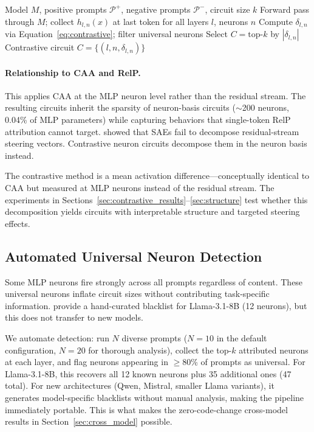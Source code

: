 \documentclass[11pt]{article}
\begin{document}
\begin{algorithm}[h]
\caption{Contrastive Neuron Discovery}
\label{alg:contrastive}
\begin{algorithmic}[1]
\REQUIRE Model $M$, positive prompts $\mathcal{P}^+$, negative prompts $\mathcal{P}^-$, circuit size $k$
    \STATE Forward pass through $M$; collect $h_{l,n}(x)$ at last token for all layers $l$, neurons $n$
\ENDFOR
\STATE Compute $\delta_{l,n}$ via Equation~\ref{eq:contrastive}; filter universal neurons
\STATE Select $C = \text{top-}k$ by $|\delta_{l,n}|$
\RETURN Contrastive circuit $C = \{(l, n, \delta_{l,n})\}$
\end{algorithmic}
\end{algorithm}

\paragraph{Relationship to CAA and RelP.}
This applies CAA at the MLP neuron level rather than the residual stream.
The resulting circuits inherit the sparsity of neuron-basis circuits (${\sim}$200 neurons, 0.04\% of MLP parameters) while capturing behaviors that single-token RelP attribution cannot target.
\citet{mayne2024sae_steering} showed that SAEs fail to decompose residual-stream steering vectors. Contrastive neuron circuits decompose them in the neuron basis instead.

The contrastive method is a mean activation difference---conceptually identical to CAA but measured at MLP neurons instead of the residual stream.
The experiments in Sections~\ref{sec:contrastive_results}--\ref{sec:structure} test whether this decomposition yields circuits with interpretable structure and targeted steering effects.

\subsection{Automated Universal Neuron Detection}
\label{sec:blacklist}

Some MLP neurons fire strongly across all prompts regardless of content.
These universal neurons inflate circuit sizes without contributing task-specific information.
\citet{arora2025circuits} provide a hand-curated blacklist for Llama-3.1-8B (12 neurons), but this does not transfer to new models.

We automate detection: run $N$ diverse prompts ($N{=}10$ in the default configuration, $N{=}20$ for thorough analysis), collect the top-$k$ attributed neurons at each layer, and flag neurons appearing in $\geq$80\% of prompts as universal.
For Llama-3.1-8B, this recovers all 12 known neurons plus 35 additional ones (47 total).
For new architectures (Qwen, Mistral, smaller Llama variants), it generates model-specific blacklists without manual analysis, making the pipeline immediately portable.
This is what makes the zero-code-change cross-model results in Section~\ref{sec:cross_model} possible.
\end{document}
